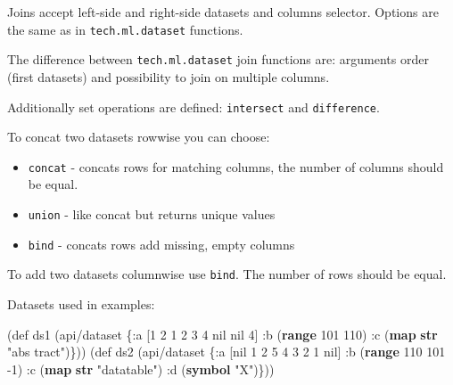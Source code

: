 \documentclass[]{article}
\newenvironment{Shaded}{\begin{snugshade}}{\end{snugshade}}
\newcommand{\AttributeTok}[1]{\textcolor[rgb]{0.77,0.63,0.00}{#1}}
\newcommand{\BuiltInTok}[1]{#1}
\newcommand{\DecValTok}[1]{\textcolor[rgb]{0.00,0.00,0.81}{#1}}
\newcommand{\FunctionTok}[1]{\textcolor[rgb]{0.00,0.00,0.00}{#1}}
\newcommand{\KeywordTok}[1]{\textcolor[rgb]{0.13,0.29,0.53}{\textbf{#1}}}
\newcommand{\NormalTok}[1]{#1}
\newcommand{\StringTok}[1]{\textcolor[rgb]{0.31,0.60,0.02}{#1}}
\newcommand{\VariableTok}[1]{\textcolor[rgb]{0.00,0.00,0.00}{#1}}
\providecommand{\tightlist}{%
  \setlength{\itemsep}{0pt}\setlength{\parskip}{0pt}}
\begin{document}
Joins accept left-side and right-side datasets and columns selector.
Options are the same as in \texttt{tech.ml.dataset} functions.

The difference between \texttt{tech.ml.dataset} join functions are:
arguments order (first datasets) and possibility to join on multiple
columns.

Additionally set operations are defined: \texttt{intersect} and
\texttt{difference}.

To concat two datasets rowwise you can choose:

\begin{itemize}
\tightlist
\item
  \texttt{concat} - concats rows for matching columns, the number of
  columns should be equal.
\item
  \texttt{union} - like concat but returns unique values
\item
  \texttt{bind} - concats rows add missing, empty columns
\end{itemize}

To add two datasets columnwise use \texttt{bind}. The number of rows
should be equal.

Datasets used in examples:

\begin{Shaded}
\begin{Highlighting}[]
\NormalTok{(}\BuiltInTok{def}\FunctionTok{ ds1 }\NormalTok{(api/dataset \{}\AttributeTok{:a}\NormalTok{ [}\DecValTok{1} \DecValTok{2} \DecValTok{1} \DecValTok{2} \DecValTok{3} \DecValTok{4} \VariableTok{nil} \VariableTok{nil} \DecValTok{4}\NormalTok{]}
                       \AttributeTok{:b}\NormalTok{ (}\KeywordTok{range} \DecValTok{101} \DecValTok{110}\NormalTok{)}
                       \AttributeTok{:c}\NormalTok{ (}\KeywordTok{map} \KeywordTok{str} \StringTok{"abs tract"}\NormalTok{)\}))}
\NormalTok{(}\BuiltInTok{def}\FunctionTok{ ds2 }\NormalTok{(api/dataset \{}\AttributeTok{:a}\NormalTok{ [}\VariableTok{nil} \DecValTok{1} \DecValTok{2} \DecValTok{5} \DecValTok{4} \DecValTok{3} \DecValTok{2} \DecValTok{1} \VariableTok{nil}\NormalTok{]}
                       \AttributeTok{:b}\NormalTok{ (}\KeywordTok{range} \DecValTok{110} \DecValTok{101} \DecValTok{-1}\NormalTok{)}
                       \AttributeTok{:c}\NormalTok{ (}\KeywordTok{map} \KeywordTok{str} \StringTok{"datatable"}\NormalTok{)}
                       \AttributeTok{:d}\NormalTok{ (}\KeywordTok{symbol} \StringTok{"X"}\NormalTok{)\}))}
\end{Highlighting}
\end{Shaded}
\end{document}

